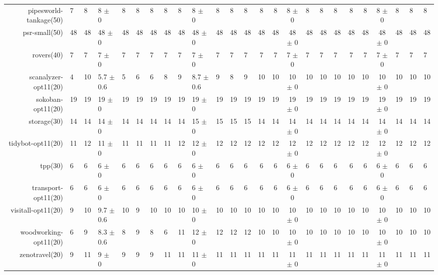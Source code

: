 \begin{center}
\begin{tabular}{|rHHHHHHHHHHHHcccHHH|cccHHH|}
pipesworld-tankage(50) & 7 & 8 & 8 $\pm$ 0 & 8 & 8 & 8 & 8 & 8 & 8 $\pm$ 0 & 8 & 8 & 8 & 8 & 8 & 8 $\pm$ 0 & 8 & 8 & 8 & 8 & 8 & 8 $\pm$ 0 & 8 & 8 & 8\\
psr-small(50) & 48 & 48 & 48 $\pm$ 0 & 48 & 48 & 48 & 48 & 48 & 48 $\pm$ 0 & 48 & 48 & 48 & 48 & 48 & 48 $\pm$ 0 & 48 & 48 & 48 & 48 & 48 & 48 $\pm$ 0 & 48 & 48 & 48\\
rovers(40) & 7 & 7 & 7 $\pm$ 0 & 7 & 7 & 7 & 7 & 7 & 7 $\pm$ 0 & 7 & 7 & 7 & 7 & 7 & 7 $\pm$ 0 & 7 & 7 & 7 & 7 & 7 & 7 $\pm$ 0 & 7 & 7 & 7\\
scanalyzer-opt11(20) & 4 & 10 & 5.7 $\pm$ 0.6 & 5 & 6 & 6 & 8 & 9 & 8.7 $\pm$ 0.6 & 9 & 8 & 9 & 10 & 10 & 10 $\pm$ 0 & 10 & 10 & 10 & 10 & 10 & 10 $\pm$ 0 & 10 & 10 & 10\\
sokoban-opt11(20) & 19 & 19 & 19 $\pm$ 0 & 19 & 19 & 19 & 19 & 19 & 19 $\pm$ 0 & 19 & 19 & 19 & 19 & 19 & 19 $\pm$ 0 & 19 & 19 & 19 & 19 & 19 & 19 $\pm$ 0 & 19 & 19 & 19\\
storage(30) & 14 & 14 & 14 $\pm$ 0 & 14 & 14 & 14 & 14 & 14 & 15 $\pm$ 0 & 15 & 15 & 15 & 14 & 14 & 14 $\pm$ 0 & 14 & 14 & 14 & 14 & 14 & 14 $\pm$ 0 & 14 & 14 & 14\\
tidybot-opt11(20) & 11 & 12 & 11 $\pm$ 0 & 11 & 11 & 11 & 11 & 12 & 12 $\pm$ 0 & 12 & 12 & 12 & 12 & 12 & 12 $\pm$ 0 & 12 & 12 & 12 & 12 & 12 & 12 $\pm$ 0 & 12 & 12 & 12\\
tpp(30) & 6 & 6 & 6 $\pm$ 0 & 6 & 6 & 6 & 6 & 6 & 6 $\pm$ 0 & 6 & 6 & 6 & 6 & 6 & 6 $\pm$ 0 & 6 & 6 & 6 & 6 & 6 & 6 $\pm$ 0 & 6 & 6 & 6\\
transport-opt11(20) & 6 & 6 & 6 $\pm$ 0 & 6 & 6 & 6 & 6 & 6 & 6 $\pm$ 0 & 6 & 6 & 6 & 6 & 6 & 6 $\pm$ 0 & 6 & 6 & 6 & 6 & 6 & 6 $\pm$ 0 & 6 & 6 & 6\\
visitall-opt11(20) & 9 & 10 & 9.7 $\pm$ 0.6 & 10 & 9 & 10 & 10 & 10 & 10 $\pm$ 0 & 10 & 10 & 10 & 10 & 10 & 10 $\pm$ 0 & 10 & 10 & 10 & 10 & 10 & 10 $\pm$ 0 & 10 & 10 & 10\\
woodworking-opt11(20) & 6 & 9 & 8.3 $\pm$ 0.6 & 8 & 9 & 8 & 6 & 11 & 12 $\pm$ 0 & 12 & 12 & 12 & 10 & 10 & 10 $\pm$ 0 & 10 & 10 & 10 & 10 & 10 & 10 $\pm$ 0 & 10 & 10 & 10\\
zenotravel(20) & 9 & 11 & 9 $\pm$ 0 & 9 & 9 & 9 & 11 & 11 & 11 $\pm$ 0 & 11 & 11 & 11 & 11 & 11 & 11 $\pm$ 0 & 11 & 11 & 11 & 11 & 11 & 11 $\pm$ 0 & 11 & 11 & 11\\
\hline
\end{tabular}
\end{center}
